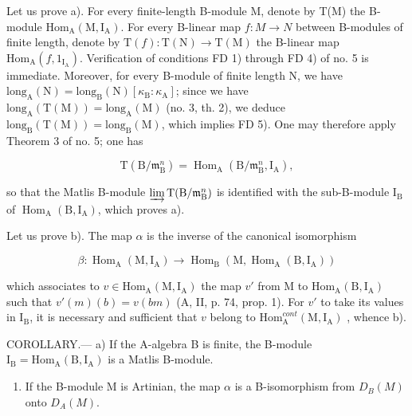 Let us prove a). For every finite-length B-module M, denote by T(M) the B-module \(\mathrm{Hom}_{\mathrm{A}}(\mathrm{M},\mathrm{I}_{\mathrm{A}})\). For every B-linear map \(f:M\to N\) between B-modules of finite length, denote by \(\mathrm{T}(f):\mathrm{T}(\mathrm{N})\to\mathrm{T}(\mathrm{M})\) the B-linear map \(\mathrm{Hom}_{\mathrm{A}}(f,1_{\mathrm{I}_{\mathrm{A}}})\). Verification of conditions FD 1) through FD 4) of no. 5 is immediate. Moreover, for every B-module of finite length N, we have \(\mathrm{long}_{\mathrm{A}}(\mathrm{N})=\mathrm{long}_{\mathrm{B}}(\mathrm{N})\left[\kappa_{\mathrm{B}}:\kappa_{\mathrm{A}}\right]\); since we have \(\mathrm{long}_{\mathrm{A}}(\mathrm{T}(\mathrm{M}))=\mathrm{long}_{\mathrm{A}}(\mathrm{M})\) (no. 3, th. 2), we deduce \(\mathrm{long}_{\mathrm{B}}(\mathrm{T}(\mathrm{M}))=\mathrm{long}_{\mathrm{B}}(\mathrm{M})\), which implies FD 5). One may therefore apply Theorem 3 of no. 5; one has

\[
\mathrm{T} (\mathrm{B} / \mathfrak {m} _ {\mathrm{B}} ^ {n}) = \operatorname{Hom} _ {\mathrm{A}} (\mathrm{B} / \mathfrak {m} _ {\mathrm{B}} ^ {n}, \mathrm{I} _ {\mathrm{A}}),
\]

so that the Matlis B-module \(\varinjlim\mathrm{T}(\mathrm{B}/\mathfrak{m}_{\mathrm{B}}^{n})\) is identified with the sub-B-module \(\mathrm{I}_{\mathrm{B}}\) of \(\operatorname{Hom}_{\mathrm{A}}(\mathrm{B},\mathrm{I}_{\mathrm{A}})\), which proves a).

Let us prove b). The map \(\alpha\) is the inverse of the canonical isomorphism

\[
\beta : \operatorname{Hom} _ {\mathrm{A}} (\mathrm{M}, \mathrm{I} _ {\mathrm{A}}) \longrightarrow \operatorname{Hom} _ {\mathrm{B}} (\mathrm{M}, \operatorname{Hom} _ {\mathrm{A}} (\mathrm{B}, \mathrm{I} _ {\mathrm{A}}))
\]

which associates to \(v \in \mathrm{Hom}_{\mathrm{A}}(\mathrm{M}, \mathrm{I}_{\mathrm{A}})\) the map \(v'\) from M to \(\mathrm{Hom}_{\mathrm{A}}(\mathrm{B}, \mathrm{I}_{\mathrm{A}})\) such that \(v'(m)(b) = v(bm)\) (A, II, p. 74, prop. 1). For \(v'\) to take its values in \(\mathrm{I}_{\mathrm{B}}\), it is necessary and sufficient that \(v\) belong to \(\mathrm{Hom}_{\mathrm{A}}^{cont}(\mathrm{M}, \mathrm{I}_{\mathrm{A}})\) , whence b).

COROLLARY.--- a) If the A-algebra B is finite, the B-module \(\mathrm{I_B} = \mathrm{Hom}_{\mathrm{A}}(\mathrm{B},\mathrm{I}_{\mathrm{A}})\) is a Matlis B-module.

\begin{enumerate}
\def\labelenumi{\alph{enumi})}
\setcounter{enumi}{1}
\tightlist
\item
  If the B-module M is Artinian, the map \(\alpha\) is a B-isomorphism from \(D_{B}(M)\) onto \(D_{A}(M)\).
\end{enumerate}

